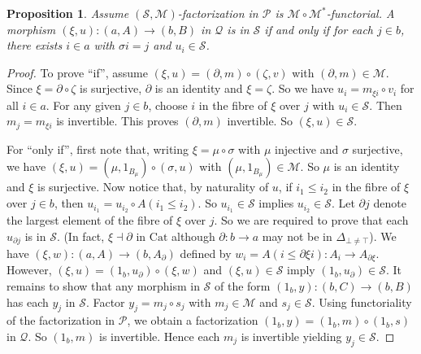 \documentclass[a4paper,12pt,reqno]{amsart}
\newtheorem{proposition}[theorem]{Proposition}
\theoremstyle{definition}
\theoremstyle{fact}
\theoremstyle{genquest}
\theoremstyle{step}
\newcommand{\lra}{\longrightarrow}
\newcommand{\ra}{\rightarrow}
\def\CM{{\mathscr M}}
\def\CP{{\mathscr P}}
\def\CQ{{\mathscr Q}}
\def\CS{{\mathscr S}}
\begin{document}
\begin{proposition}\label{ess}
Assume $(\CS,\CM)$-factorization in $\CP$ is $\CM\circ \CM^*$-functorial. 
A morphism $(\xi,u) : (a,A)\lra (b,B)$ in $\CQ$ is in $\CS$ if and only if for each $j\in b$, 
there exists $i\in a$ with $\sigma i = j$ and $u_i \in \CS$.
\end{proposition} 
\begin{proof} To prove ``if'', assume $(\xi,u) = (\partial,m)\circ (\zeta,v)$ 
with $(\partial,m)\in \CM$. Since $\xi = \partial \circ \zeta$ is surjective, $\partial$ is
an identity and $\xi = \zeta$. So we have $u_i = m_{\xi i}\circ v_i$ for all $i\in a$.
For any given $j\in b$, choose $i$ in the fibre of $\xi$ over $j$ with $u_i \in \CS$. 
Then $m_j = m_{\xi i}$ is invertible. This proves $(\partial,m)$ invertible. So
$(\xi,u)\in \CS$.

For ``only if'', first note that, writing $\xi = \mu \circ \sigma$ with $\mu$ injective
and $\sigma$ surjective, we have $(\xi,u) = (\mu, 1_{B_{\mu}})\circ (\sigma,u)$
with $(\mu, 1_{B_{\mu}})\in \CM$. So $\mu$ is an identity and $\xi$ is surjective.  
Now notice that, by naturality of $u$, if $i_1\le i_2$ in the fibre of $\xi$ over
$j\in b$, then $u_{i_1} = u_{i_2} \circ A(i_1\le i_2)$. So $u_{i_1}\in \CS$ implies
$u_{i_2}\in \CS$. Let $\partial j$ denote the largest element of the fibre of $\xi$ over $j$.
So we are required to prove that each $u_{\partial j}$ is in $\CS$.
(In fact, $\xi \dashv \partial$ in $\mathrm{Cat}$ although $\partial : b \ra a$ may not be 
in $\Delta_{\bot \neq \top}$). We have $(\xi,w) : (a,A) \lra (b,A_{\partial})$ defined by
$w_i = A(i\le \partial \xi i) : A_i \lra A_{\partial \xi}$. However, 
$(\xi,u) = (1_b, u_{\partial})\circ (\xi,w)$ and $(\xi,u)\in \CS$ imply 
$(1_b, u_{\partial})\in \CS$. It remains to show that any morphism in $\CS$ of
the form $(1_b,y):(b,C)\lra (b,B)$ has each $y_j$ in $\CS$. Factor $y_j=m_j \circ s_j$
with $m_j\in \CM$ and $s_j\in \CS$. Using functoriality of the factorization in $\CP$,
we obtain a factorization $(1_b,y) = (1_b,m)\circ (1_b,s)$ in $\CQ$.
So $(1_b,m)$ is invertible. Hence each $m_j$ is invertible yielding $y_j\in \CS$.     
\end{proof}
\end{document}
